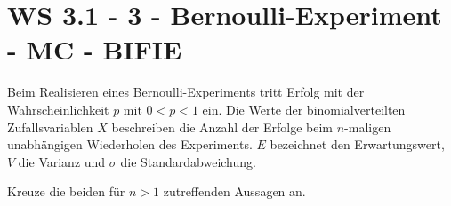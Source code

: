 \section{WS 3.1 - 3 - Bernoulli-Experiment - MC - BIFIE}

\begin{beispiel}[WS 3.1]{1} %
Beim Realisieren eines Bernoulli-Experiments tritt Erfolg mit der Wahrscheinlichkeit $p$ mit
$0 < p < 1$ ein. Die Werte der binomialverteilten Zufallsvariablen $X$ beschreiben die Anzahl der
Erfolge beim $n$-maligen unabhängigen Wiederholen des Experiments. $E$ bezeichnet den Erwartungswert,
$V$ die Varianz und $\sigma$ die Standardabweichung.\leer

Kreuze die beiden für $n>1$ zutreffenden Aussagen an.

\end{beispiel} 